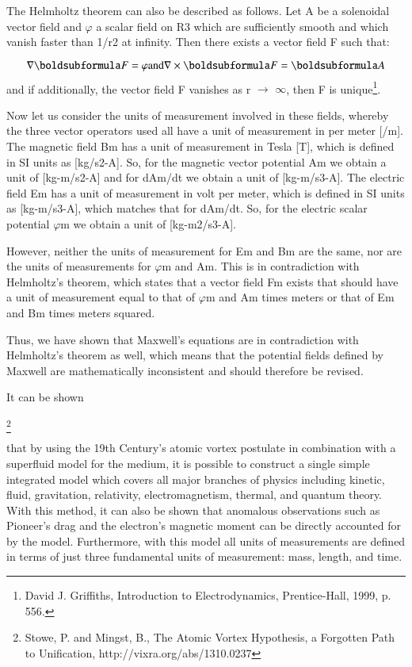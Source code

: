 \documentclass[twoside,final]{article}
\begin{document}
{The Helmholtz theorem can also be described as follows. Let A be a solenoidal
vector field and $\varphi $ a scalar field on R3 which are sufficiently smooth
and which vanish faster than 1/r2 at infinity. Then there exists a vector field
F such that:

\begin{equation}
\nabla \boldsubformula F=\varphi \text{and}\nabla \times \boldsubformula F=\boldsubformula A
\end{equation}
and if additionally, the vector field F vanishes as r $\rightarrow $ ${\infty}$,
then F is unique\footnote{ David J. Griffiths, Introduction to Electrodynamics,
Prentice-Hall, 1999, p. 556.\par }.

Now let us consider the units of measurement involved in these fields, whereby
the three vector operators used all have a unit of measurement in per meter
[/m]. The magnetic field Bm has a unit of measurement in Tesla [T], which is
defined in SI units as [kg/s2{}-A]. So, for the magnetic vector potential Am we
obtain a unit of [kg-m/s2{}-A] and for dAm/dt we obtain a unit of [kg-m/s3{}-A].
The electric field Em has a unit of measurement in volt per meter, which is
defined in SI units as [kg-m/s3{}-A], which matches that for dAm/dt. So, for the
electric scalar potential $\varphi $m we obtain a unit of [kg-m2/s3{}-A].

However, neither the units of measurement for Em and Bm are the same, nor are
the units of measurements for $\varphi $m and Am. This is in contradiction with
Helmholtz's theorem, which states that a vector field Fm exists that should have
a unit of measurement equal to that of $\varphi $m and Am times meters or that
of Em and Bm times meters squared.

Thus, we have shown that Maxwell's equations are in contradiction with
Helmholtz's theorem as well, which means that the potential fields defined by
Maxwell are mathematically inconsistent and should therefore be revised.

It can be shown

\footnote{ Stowe, P. and Mingst, B., The Atomic Vortex Hypothesis, a Forgotten
Path to Unification, http://vixra.org/abs/1310.0237 \par } 

that by using the 19th Century's atomic vortex postulate in combination with a
superfluid model for the medium, it is possible to construct a single simple
integrated model which covers all major branches of physics including kinetic,
fluid, gravitation, relativity, electromagnetism, thermal, and quantum theory.
With this method, it can also be shown that anomalous observations such as
Pioneer's drag and the electron's magnetic moment can be directly accounted for
by the model. Furthermore, with this model all units of measurements are defined
in terms of just three fundamental units of measurement: mass, length, and time. 

}
\end{document}
